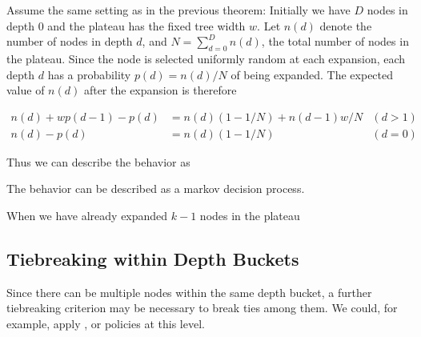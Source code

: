 Assume the same setting as in the previous theorem: Initially we have
$D$ nodes in depth 0 and the plateau has the fixed tree width $w$.
Let $n(d)$ denote the number of nodes in depth $d$, and
$N=\sum_{d=0}^{D}n(d)$, the total number of nodes in the plateau.
Since the node is
selected uniformly random at each expansion, each depth $d$ has a
probability $p(d) = n(d)/N$ of being expanded.
The expected value of $n(d)$ after the expansion is therefore

\begin{align*}
 n(d)+wp(d-1)-p(d) &= n(d) (1-1/N) + n(d-1) w/N &(d>1) \\
 n(d)        -p(d) &= n(d) (1-1/N)              &(d=0) 
\end{align*}

Thus we can describe the behavior as 



The behavior can be described as a markov decision process.



When we have already expanded $k-1$ nodes in the plateau 


\subsection{Tiebreaking within Depth Buckets}


Since there can be multiple nodes within the same depth bucket,
a further tiebreaking criterion may be necessary to break ties among them.
We could, for example, apply \lifo, \fifo or \ro policies at this level.

